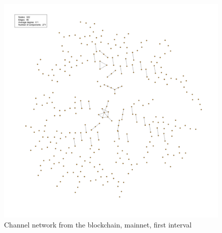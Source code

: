 \begin{figure}[ht]
    \centering
    \includegraphics[width=13cm]{figures/graphs/cg_bc_mainnet_run1.png}
    \caption{Channel network from the blockchain, mainnet, first interval}
    \label{fig:channel_network_BC_mainnet}
\end{figure}
